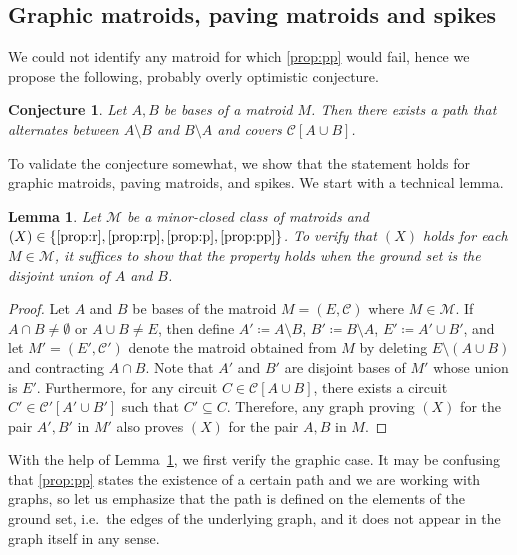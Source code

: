 \documentclass[11pt,a4paper]{article}
\theoremstyle{plain}
\newtheorem{lem}[thm]{Lemma}
\newtheorem{conj}{Conjecture}
\theoremstyle{definition}
\newcommand{\cC}{\mathcal{C}}
\newcommand{\cM}{\mathcal{M}}
\newcommand{\bs}{\backslash}
\begin{document}
\subsection{Graphic matroids, paving matroids and spikes}
\label{sec:solved}

We could not identify any matroid for which \ref{prop:pp} would fail, hence we propose the following, probably overly optimistic conjecture.


\begin{conj}\label{conj:pp}
Let $A,B$ be bases of a matroid $M$. Then there exists a path that alternates between $A\setminus B$ and $B\setminus A$ and covers $\cC[A\cup B]$. 
\end{conj}


To validate the conjecture somewhat, we show that the statement holds for graphic matroids, paving matroids, and spikes. 
We start with a technical lemma. 

\begin{lem}\label{lem:disj}
Let $\cM$ be a minor-closed class of matroids and ${(X)\in\{\ref{prop:r},\ref{prop:rp},\ref{prop:p},\ref{prop:pp}\}}$. To verify that $(X)$ holds for each $M\in\cM$, it suffices to show that the property holds when the ground set is the disjoint union of $A$ and $B$.
\end{lem}
\begin{proof}
Let $A$ and $B$ be bases of the matroid $M=(E,\cC)$ where $M\in\cM$. If $A\cap B\neq\emptyset$ or $A\cup B\neq E$, then define $A'\coloneqq A\setminus B$, $B'\coloneqq B\setminus A$, $E'\coloneqq A'\cup B'$, and let $M'=(E',\cC')$ denote the matroid obtained from $M$ by deleting $E\setminus (A\cup B)$ and contracting $A\cap B$. Note that $A'$ and $B'$ are disjoint bases of $M'$ whose union is $E'$. Furthermore, for any circuit $C\in\cC[A\cup B]$, there exists a circuit $C'\in\cC'[A'\cup B']$ such that $C'\subseteq C$. Therefore, any graph proving $(X)$ for the pair $A',B'$ in $M'$ also proves $(X)$ for the pair $A,B$ in $M$.   
\end{proof}

With the help of Lemma~\ref{lem:disj}, we first verify the graphic case. It may be confusing that \ref{prop:pp} states the existence of a certain path and we are working with graphs, so let us emphasize that the path is defined on the elements of the ground set, i.e.\ the edges of the underlying graph, and it does not appear in the graph itself in any sense. 
\end{document}
